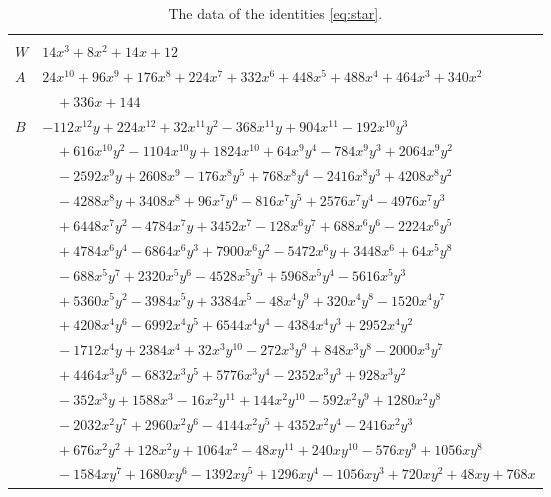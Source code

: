 \documentclass[11pt]{article}
\begin{document}
\clearpage
\begingroup\footnotesize
\setlength{\LTcapwidth}{\textwidth}
\begin{longtable}{@{}ll@{}}
\caption{The data of the identities \eqref{eq:star}.}\label{tab:star}\\
\hline\endfirsthead\hline\endhead\hline\endfoot
\multicolumn{2}{@{}l}{$i=0$, $m=4$, neighbours $1,2,3,4,5,6,13$}\\
$W$ & $14x^{3}+8x^{2}+14x+12$\\
$A$ & $24x^{10}+96x^{9}+176x^{8}+224x^{7}+332x^{6}+448x^{5}+488x^{4}+464x^{3}+340x^{2}$\\
 & $\quad +336x+144$\\
$B$ & $-112x^{12}y+224x^{12}+32x^{11}y^{2}-368x^{11}y+904x^{11}-192x^{10}y^{3}$\\
 & $\quad +616x^{10}y^{2}-1104x^{10}y+1824x^{10}+64x^{9}y^{4}-784x^{9}y^{3}+2064x^{9}y^{2}$\\
 & $\quad -2592x^{9}y+2608x^{9}-176x^{8}y^{5}+768x^{8}y^{4}-2416x^{8}y^{3}+4208x^{8}y^{2}$\\
 & $\quad -4288x^{8}y+3408x^{8}+96x^{7}y^{6}-816x^{7}y^{5}+2576x^{7}y^{4}-4976x^{7}y^{3}$\\
 & $\quad +6448x^{7}y^{2}-4784x^{7}y+3452x^{7}-128x^{6}y^{7}+688x^{6}y^{6}-2224x^{6}y^{5}$\\
 & $\quad +4784x^{6}y^{4}-6864x^{6}y^{3}+7900x^{6}y^{2}-5472x^{6}y+3448x^{6}+64x^{5}y^{8}$\\
 & $\quad -688x^{5}y^{7}+2320x^{5}y^{6}-4528x^{5}y^{5}+5968x^{5}y^{4}-5616x^{5}y^{3}$\\
 & $\quad +5360x^{5}y^{2}-3984x^{5}y+3384x^{5}-48x^{4}y^{9}+320x^{4}y^{8}-1520x^{4}y^{7}$\\
 & $\quad +4208x^{4}y^{6}-6992x^{4}y^{5}+6544x^{4}y^{4}-4384x^{4}y^{3}+2952x^{4}y^{2}$\\
 & $\quad -1712x^{4}y+2384x^{4}+32x^{3}y^{10}-272x^{3}y^{9}+848x^{3}y^{8}-2000x^{3}y^{7}$\\
 & $\quad +4464x^{3}y^{6}-6832x^{3}y^{5}+5776x^{3}y^{4}-2352x^{3}y^{3}+928x^{3}y^{2}$\\
 & $\quad -352x^{3}y+1588x^{3}-16x^{2}y^{11}+144x^{2}y^{10}-592x^{2}y^{9}+1280x^{2}y^{8}$\\
 & $\quad -2032x^{2}y^{7}+2960x^{2}y^{6}-4144x^{2}y^{5}+4352x^{2}y^{4}-2416x^{2}y^{3}$\\
 & $\quad +676x^{2}y^{2}+128x^{2}y+1064x^{2}-48xy^{11}+240xy^{10}-576xy^{9}+1056xy^{8}$\\
 & $\quad -1584xy^{7}+1680xy^{6}-1392xy^{5}+1296xy^{4}-1056xy^{3}+720xy^{2}+48xy+768x$\\

\end{longtable}
\end{document}
